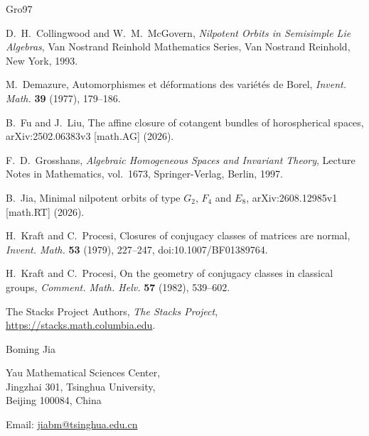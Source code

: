 \documentclass[12pt]{article}
\theoremstyle{remark}
\theoremstyle{plain}
\begin{document}
\begin{thebibliography}{Gro97}

D.~H.~Collingwood and W.~M.~McGovern,
\emph{Nilpotent Orbits in Semisimple Lie Algebras},
Van Nostrand Reinhold Mathematics Series, Van Nostrand Reinhold,
New York, 1993.

M.~Demazure, Automorphismes et d\'eformations des vari\'et\'es de Borel,
\emph{Invent. Math.} \textbf{39} (1977), 179--186.

B.~Fu and J.~Liu,
The affine closure of cotangent bundles of horospherical spaces,
arXiv:2502.06383v3 [math.AG] (2026).

F.~D.~Grosshans,
\emph{Algebraic Homogeneous Spaces and Invariant Theory},
Lecture Notes in Mathematics, vol.~1673, Springer-Verlag, Berlin, 1997.

B.~Jia,
Minimal nilpotent orbits of type $G_2$, $F_4$ and $E_8$,
arXiv:2608.12985v1 [math.RT] (2026).

H.~Kraft and C.~Procesi,
Closures of conjugacy classes of matrices are normal,
\emph{Invent. Math.} \textbf{53} (1979), 227--247,
doi:10.1007/BF01389764.

H.~Kraft and C.~Procesi,
On the geometry of conjugacy classes in classical groups,
\emph{Comment. Math. Helv.} \textbf{57} (1982), 539--602.

The Stacks Project Authors,
\emph{The Stacks Project},
\url{https://stacks.math.columbia.edu}.

\end{thebibliography}

\bigskip
\noindent
Boming Jia

\noindent
Yau Mathematical Sciences Center,\\
Jingzhai 301, Tsinghua University,\\
Beijing 100084, China

\noindent
Email: \href{mailto:jiabm@tsinghua.edu.cn}{jiabm@tsinghua.edu.cn}
\end{document}
